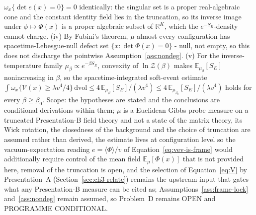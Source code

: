 \(\omega_x\{\det e(x)=0\}=0\) identically: the singular set is a proper real-algebraic cone and the constant identity field lies in the truncation, so its inverse image under \(\phi\mapsto\Phi(x)\) is a proper algebraic subset of \(\mathbb R^K\), which the \(e^{-S_E}\)-density cannot charge. (iv) By Fubini's theorem, \(\mu\)-almost every configuration has spacetime-Lebesgue-null defect set \(\{x:\det\Phi(x)=0\}\) - null, not empty, so this does not discharge the pointwise Assumption~\ref{ass:nondeg}. (v) For the inverse-temperature family \(\mu_\beta\propto e^{-\beta S_E}\), convexity of \(\ln\mathcal Z(\beta)\) makes \(\mathbb E_{\mu_\beta}[S_E]\) nonincreasing in \(\beta\), so the spacetime-integrated soft-event estimate \(\int\omega_x\{\mathcal V(x)\ge\lambda v^4/4\}\,\mathrm{dvol}\le4\,\mathbb E_{\mu_\beta}[S_E]/(\lambda v^4)\le4\,\mathbb E_{\mu_{\beta_0}}[S_E]/(\lambda v^4)\) holds for every \(\beta\ge\beta_0\). Scope: the hypotheses are stated and the conclusions are conditional derivations within them; \(\mu\) is a Euclidean Gibbs probe measure on a truncated Presentation-B field theory and not a state of the matrix theory, its Wick rotation, the closedness of the background and the choice of truncation are assumed rather than derived, the estimate lives at configuration level so the vacuum-expectation reading \(e=\langle\Phi\rangle/v\) of Equation~\eqref{eq:vev-is-frame} would additionally require control of the mean field \(\mathbb E_\mu[\Phi(x)]\) that is not provided here, removal of the truncation is open, and the selection of Equation~\eqref{eq:V} by Presentation~A (Section~\ref{sec:ch3-relate}) remains the upstream input that gates what any Presentation-B measure can be cited as; Assumptions~\ref{ass:frame-lock} and~\ref{ass:nondeg} remain assumed, so Problem~D remains OPEN and PROGRAMME CONDITIONAL.

